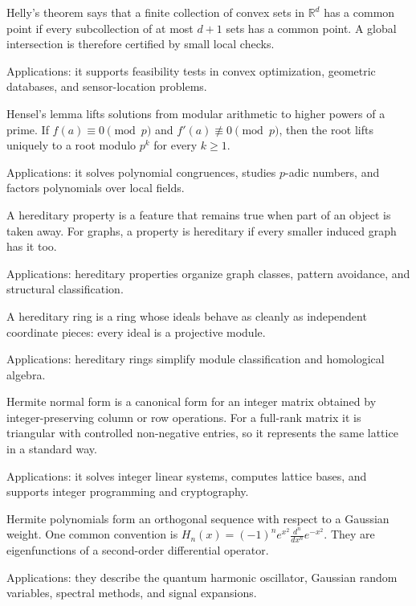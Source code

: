 Helly's theorem says that a finite collection of convex sets in $\mathbb{R}^d$ has a common point if every subcollection of at most $d+1$ sets has a common point. A global intersection is therefore certified by small local checks. \par\noindent Applications: it supports feasibility tests in convex optimization, geometric databases, and sensor-location problems.

Hensel's lemma lifts solutions from modular arithmetic to higher powers of a prime. If $f(a)\equiv0\pmod p$ and $f'(a)\not\equiv0\pmod p$, then the root lifts uniquely to a root modulo $p^k$ for every $k\geq1$. \par\noindent Applications: it solves polynomial congruences, studies $p$-adic numbers, and factors polynomials over local fields.

A hereditary property is a feature that remains true when part of an object is taken away. For graphs, a property is hereditary if every smaller induced graph has it too. \par\noindent Applications: hereditary properties organize graph classes, pattern avoidance, and structural classification.

A hereditary ring is a ring whose ideals behave as cleanly as independent coordinate pieces: every ideal is a projective module. \par\noindent Applications: hereditary rings simplify module classification and homological algebra.

Hermite normal form is a canonical form for an integer matrix obtained by integer-preserving column or row operations. For a full-rank matrix it is triangular with controlled non-negative entries, so it represents the same lattice in a standard way. \par\noindent Applications: it solves integer linear systems, computes lattice bases, and supports integer programming and cryptography.

Hermite polynomials form an orthogonal sequence with respect to a Gaussian weight. One common convention is $H_n(x)=(-1)^ne^{x^2}\frac{d^n}{dx^n}e^{-x^2}$. They are eigenfunctions of a second-order differential operator. \par\noindent Applications: they describe the quantum harmonic oscillator, Gaussian random variables, spectral methods, and signal expansions.

